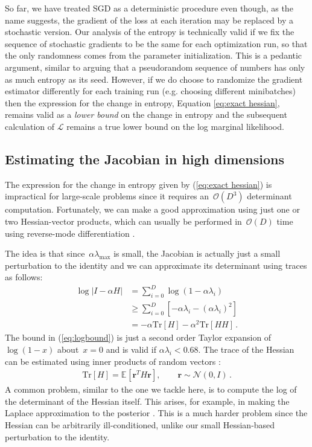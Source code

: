 \documentclass[]{article}
\newcommand{\vr}{\mathbf{r}}
\newcommand{\expectargs}[2]{\mathbb{E}_{#1} \left[ {#2} \right]}
\newcommand{\varL}{\mathcal{L}}
\newcommand{\N}[2]{\mathcal{N}\!\left(#1,#2\right)}
\newcommand{\stepsize}{\alpha}
\newcommand{\bigo}[1]{\mathcal{O}\left(#1\right)}
\newcommand{\trace}[1]{\text{Tr}\left[#1\right]}
\begin{document}
So far, we have treated SGD as a deterministic procedure even though, as the name suggests,
the gradient of the loss at each iteration may be replaced by a stochastic
version. Our analysis of the entropy is technically valid if we fix the sequence of stochastic gradients to be the same for each optimization run, so that the only randomness comes from the parameter initialization.
This is a pedantic argument, similar to arguing that a pseudorandom sequence of numbers has only as much entropy as its seed.
However, if we do choose to randomize the gradient estimator differently for each training run
(e.g. choosing different minibatches) then the expression for the change in entropy, Equation \ref{eq:exact hessian}, remains valid as a \emph{lower bound} on the change in entropy and the 
subsequent calculation of $\varL$ remains a true lower bound on the log marginal likelihood.


\subsection{Estimating the Jacobian in high dimensions}
The expression for the change in entropy given by (\ref{eq:exact hessian}) is impractical for large-scale problems since it requires an~$\bigo{D^3}$ determinant computation.
Fortunately, we can make a good approximation using just one or two Hessian-vector products, which can usually be performed in~$\bigo{D}$ time using reverse-mode differentiation \citep{pearlmutter1994fast}.

The idea is that since~$\stepsize\lambda_{\text{max}}$ is small, the Jacobian is actually just a small perturbation to the identity and we can approximate its determinant using traces as follows:
%
\begin{align}
\log \left| I - \stepsize H \right|
& =    \sum_{i=0}^D \log\left(1 - \stepsize\lambda_i\right) \nonumber \\
& \geq \sum_{i=0}^D \left[- \stepsize\lambda_i 
                        - (\stepsize\lambda_i)^2 \right] \label{eq:logbound} \\
& = - \stepsize \trace{H} - \stepsize^2 \trace{HH}\,.
\end{align}
%
The bound in (\ref{eq:logbound}) is just a second order Taylor expansion of~$\log(1 - x)$ about~${x = 0}$ and is valid if ${\stepsize\lambda_i < 0.68}$.
The trace of the Hessian can be estimated using inner products of random vectors
\citep{bai1996some}:
%
\begin{align}
\trace{H} = \expectargs{}{\vr^TH\vr}, \qquad \vr \sim \N{0}{I}\,.
\label{eq:approx-log-det}
\end{align}
%
A common problem, similar to the one we tackle here, is to compute the log of the determinant of the Hessian itself.
This arises, for example, in making the Laplace approximation to the posterior \citep{mackay1992practical}.
This is a much harder problem since the Hessian can be arbitrarily ill-conditioned, unlike our small Hessian-based perturbation to the identity.
\end{document}
